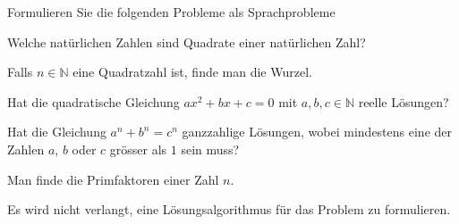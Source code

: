 Formulieren Sie die folgenden Probleme als Sprachprobleme
\begin{teilaufgaben}
\item Welche natürlichen Zahlen sind Quadrate einer natürlichen Zahl?
\item Falls $n\in\mathbb N$ eine Quadratzahl ist, finde man die Wurzel.
\item Hat die quadratische Gleichung $ax^2+bx+c=0$ mit $a,b,c\in\mathbb N$
reelle Lösungen?
\item Hat die Gleichung $a^n+b^n=c^n$ ganzzahlige Lösungen, wobei mindestens
eine der Zahlen $a$, $b$ oder $c$ grösser als $1$ sein muss?
\item Man finde die Primfaktoren einer Zahl $n$.
\end{teilaufgaben}

\begin{hinweis}
Es wird nicht verlangt, eine Lösungsalgorithmus für das Problem zu
formulieren.
\end{hinweis}

